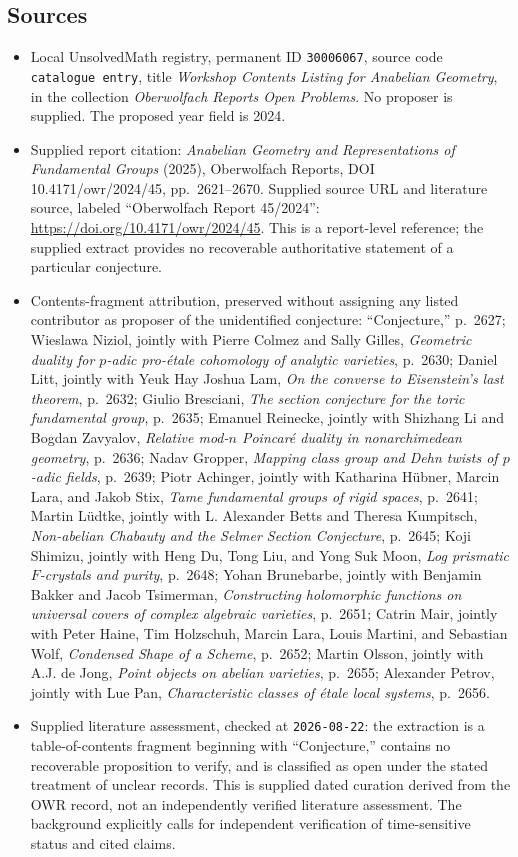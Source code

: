 \documentclass[11pt]{article}
\begin{document}
\subsection{Sources}
\begin{itemize}
\item Local UnsolvedMath registry, permanent ID \texttt{30006067}, source code \texttt{catalogue entry}, title \emph{Workshop Contents Listing for Anabelian Geometry}, in the collection \emph{Oberwolfach Reports Open Problems}. No proposer is supplied. The proposed year field is 2024.
\item Supplied report citation: \emph{Anabelian Geometry and Representations of Fundamental Groups} (2025), Oberwolfach Reports, DOI 10.4171/owr/2024/45, pp.~2621--2670. Supplied source URL and literature source, labeled ``Oberwolfach Report 45/2024'': \url{https://doi.org/10.4171/owr/2024/45}. This is a report-level reference; the supplied extract provides no recoverable authoritative statement of a particular conjecture.
\item Contents-fragment attribution, preserved without assigning any listed contributor as proposer of the unidentified conjecture: ``Conjecture,'' p.~2627; Wieslawa Niziol, jointly with Pierre Colmez and Sally Gilles, \emph{Geometric duality for $p$-adic pro-\'{e}tale cohomology of analytic varieties}, p.~2630; Daniel Litt, jointly with Yeuk Hay Joshua Lam, \emph{On the converse to Eisenstein's last theorem}, p.~2632; Giulio Bresciani, \emph{The section conjecture for the toric fundamental group}, p.~2635; Emanuel Reinecke, jointly with Shizhang Li and Bogdan Zavyalov, \emph{Relative mod-$n$ Poincar\'{e} duality in nonarchimedean geometry}, p.~2636; Nadav Gropper, \emph{Mapping class group and Dehn twists of $p$-adic fields}, p.~2639; Piotr Achinger, jointly with Katharina H\"{u}bner, Marcin Lara, and Jakob Stix, \emph{Tame fundamental groups of rigid spaces}, p.~2641; Martin L\"{u}dtke, jointly with L. Alexander Betts and Theresa Kumpitsch, \emph{Non-abelian Chabauty and the Selmer Section Conjecture}, p.~2645; Koji Shimizu, jointly with Heng Du, Tong Liu, and Yong Suk Moon, \emph{Log prismatic $F$-crystals and purity}, p.~2648; Yohan Brunebarbe, jointly with Benjamin Bakker and Jacob Tsimerman, \emph{Constructing holomorphic functions on universal covers of complex algebraic varieties}, p.~2651; Catrin Mair, jointly with Peter Haine, Tim Holzschuh, Marcin Lara, Louis Martini, and Sebastian Wolf, \emph{Condensed Shape of a Scheme}, p.~2652; Martin Olsson, jointly with A.J. de Jong, \emph{Point objects on abelian varieties}, p.~2655; Alexander Petrov, jointly with Lue Pan, \emph{Characteristic classes of \'{e}tale local systems}, p.~2656.
\item Supplied literature assessment, checked at \texttt{2026-08-22}: the extraction is a table-of-contents fragment beginning with ``Conjecture,'' contains no recoverable proposition to verify, and is classified as open under the stated treatment of unclear records. This is supplied dated curation derived from the OWR record, not an independently verified literature assessment. The background explicitly calls for independent verification of time-sensitive status and cited claims.
\end{itemize}
\end{document}
